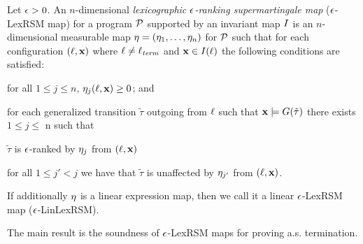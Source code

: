 \begin{definition}
Let $\epsilon>0$. An $n$-dimensional \emph{lexicographic $\epsilon$-ranking supermartingale map} ($\epsilon$-LexRSM map) for a program $\mathcal{P}$ supported by an invariant map $I$ is an $n$-dimensional measurable map $\mathbf{\eta}=(\eta_1,\dots,\eta_n)$ for $\mathcal{P}$ such that for each configuration $(\ell,\mathbf{x})$ where $\ell\neq \ell_{\mathit{term}}$ and $\mathbf{x}\in I(\ell)$ the following conditions are satisfied:
 \begin{compactitem}
 	\item
 	for all $1\leq j \leq n$, $\eta_j(\ell,\mathbf{x})\geq 0$; and
 	\item 
 	for each generalized transition $\tilde{\tau}$ outgoing from $\ell$ such that $\mathbf{x}\models G(\tilde\tau)$ there 
 	exists $1\leq j 
 	\leq$ n such that
 	\begin{compactitem}
 	\item
 	$\tilde{\tau}$ is $\epsilon$-ranked by $\eta_j$ from $(\ell,\mathbf{x})$
 	\item
 	for all $1\leq j'<j$ we have that $\tilde{\tau}$ is unaffected by 
 	$\eta_{j'}$ from $(\ell,\mathbf{x})$.
 	\end{compactitem}
 \end{compactitem}
If additionally $\eta$ is a linear expression map, then we call it a linear $\epsilon$-LexRSM map ($\epsilon$-LinLexRSM).
\end{definition}


The main result is the soundness of $\epsilon$-LexRSM maps for proving a.s. 
termination.

